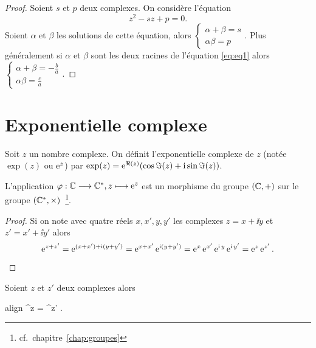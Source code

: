 \begin{proof}
    Soient \(s\) et \(p\) deux complexes. On considère l'équation
    \begin{equation*}
        z^2-sz + p = 0.
    \end{equation*}
    Soient \(\alpha\) et \(\beta\) les solutions de cette équation, alors
    \(\begin{cases} \alpha  + \beta = s \\ \alpha \beta = p \end{cases}\).
    Plus généralement si \(\alpha\) et \(\beta\) sont les deux racines de 
    l'équation \eqref{eq:eq1} alors \(\begin{cases} \alpha + \beta = 
    -\frac{b}{a} \\ \alpha \beta = \frac{c}{a} \end{cases}\).
\end{proof}

\section{Exponentielle complexe}
\label{sec:expcomplexe}

\begin{defdef}
    Soit \(z\) un nombre complexe. On définit l'exponentielle complexe de \(z\) 
    (notée \(\exp(z)\) ou \(\operatorname{e}^z\)) par \(\exp(z) = \operatorname{e}^{\Re(z)}(\cos \Im(z) + \operatorname{i} 
    \sin \Im(z))\).
\end{defdef}

\begin{prop}
    L'application \(\varphi:\mathbb{C} \longrightarrow \mathbb{C}^*, z \longmapsto \operatorname{e}^z\) est un morphisme du 
    groupe \((\mathbb{C}, + )\) sur le groupe \((\mathbb{C}^*,\times)\)~\footnote{cf.\ 
    chapitre~\ref{chap:groupes}}.
\end{prop}

\begin{proof}
    Si on note avec quatre réels \(x,x',y,y'\) les complexes \(z = x + \ii y\) et 
    \(z' = x' + \ii y'\) alors
    \begin{equation*}
        \operatorname{e}^{z + z'}  =  \operatorname{e}^{(x + x') + \operatorname{i}(y + y')} = \operatorname{e}^{x + x'} \operatorname{e}^{\operatorname{i} (y + 
        y')} = \operatorname{e}^{x} \operatorname{e}^{x'} \operatorname{e}^{\operatorname{i} y} \operatorname{e}^{\operatorname{i} y'} = \operatorname{e}^z \operatorname{e}^{z'}.
    \end{equation*}
\end{proof}

\begin{prop}
    Soient \(z\) et \(z'\) deux complexes alors
    \begin{empheq}[box = \shadowbox*]{align}
        \e^z = \e^{z'} \iff {}.
    \end{empheq}
\end{prop}

